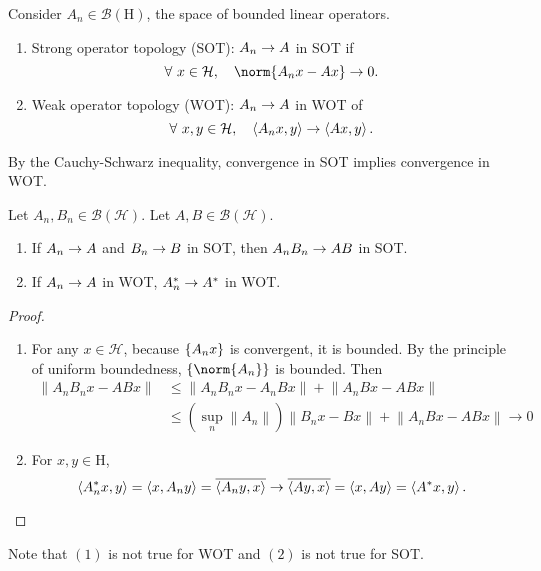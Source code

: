 \documentclass[a4paper,12pt]{article}
\begin{document}
\begin{defn}
    Consider $A_n \in \mathcal{B}(\mathrm{H})$, the space of bounded linear operators.
    \begin{enumerate}[label=(\arabic{*})]
        \item Strong operator topology (SOT): $A_n \rightarrow A$ in SOT if
        \begin{equation*}
            \forall~x \in \mathcal{H},\quad \norm{A_nx - Ax} \sto 0.
        \end{equation*}
        \item Weak operator topology (WOT): $A_n \rightarrow A$ in WOT of
        \begin{equation*}
            \forall~x,y \in \mathcal{H},\quad \left\langle A_nx,y \right\rangle \rightarrow \left\langle Ax,y \right\rangle.
        \end{equation*}
    \end{enumerate}
\end{defn}
\begin{rmk}
    By the Cauchy-Schwarz inequality, convergence in SOT implies convergence in WOT.
\end{rmk}
\begin{prop}
    Let $A_n,B_n \in \mathcal{B}(\mathcal{H})$. Let $A,B \in \mathcal{B}(\mathcal{H})$.
    \begin{enumerate}[label=(\arabic{*})]
        \item If $A_n \rightarrow A$ and $B_n \rightarrow B$ in SOT, then $A_nB_n \rightarrow AB$ in SOT.
        \item If $A_n \rightarrow A$ in WOT, $A_n^* \rightarrow A^*$ in WOT.
    \end{enumerate}
\end{prop}
\begin{proof}
    \begin{enumerate}[label=(\arabic{*})]
        \item For any $x\in \mathcal{H}$, because $\left\{A_nx\right\}$ is convergent, it is bounded. By the principle of uniform boundedness, $\bb{\norm{A_n}}$ is bounded. Then
        \begin{equation*}
            \begin{aligned}
                \left\|A_n B_n x-A B x\right\| & \leq\left\|A_n B_n x-A_n B x\right\|+\left\|A_n B x-A B x\right\| \\
                & \leq\left(\sup _n\left\|A_n\right\|\right)\left\|B_n x-B x\right\|+\left\|A_n B x-A B x\right\| \rightarrow 0
            \end{aligned}
        \end{equation*}

        \item For $x,y \in \mathrm{H}$,
        \begin{equation*}
            \left\langle A_n^* x, y \right\rangle= \left\langle x, A_n y \right\rangle=\overline{\left\langle A_n y, x \right\rangle} \rightarrow \overline{\left\langle A y, x \right\rangle}=\left\langle x, A y \right\rangle=\left\langle A^* x, y \right\rangle. \qedhere
        \end{equation*}
    \end{enumerate}
\end{proof}
\begin{rmk}
    Note that $(1)$ is not true for WOT and $(2)$ is not true for SOT.
\end{rmk}
\end{document}

